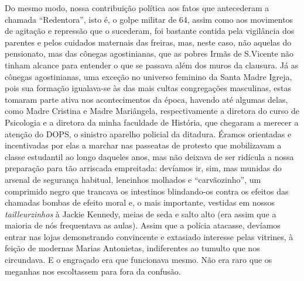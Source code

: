 Do mesmo modo, nossa contribuição política aos fatos que antecederam a chamada ``Redentora'', isto é, o golpe militar de 64, assim como aos movimentos de agitação e repressão que o sucederam, foi bastante contida pela vigilância dos parentes e pelos cuidados maternais das freiras, mas, neste caso, não aquelas do pensionato, mas das cônegas agostinianas, que as pobres Irmãs de S.Vicente não tinham alcance para entender o que se passava  além dos muros da clausura.
Já as cônegas agostinianas, uma exceção no universo feminino da Santa Madre Igreja, pois sua formação igualava-se às das mais cultas congregações masculinas, estas tomaram parte ativa nos acontecimentos da época, havendo até algumas delas, como Madre Cristina e Madre Mariângela, respectivamente a diretora do curso de Psicologia e a diretora da minha faculdade de História, que chegaram a merecer a atenção do DOPS, o sinistro aparelho policial da ditadura.
Éramos orientadas e incentivadas por elas a marchar nas passeatas de protesto que mobilizavam a classe estudantil ao longo daqueles anos, mas não deixava de ser ridícula a nossa preparação para tão arriscada empreitada: devíamos ir, sim, mas munidas do arsenal de segurança habitual, lencinhos molhados e ``carvãozinho'', um comprimido negro que trancava os intestinos blindando-os contra os efeitos das chamadas bombas de efeito moral e, o mais importante, vestidas em nossos \textit{tailleurzinhos} à Jackie Kennedy, meias de seda e salto alto (era assim que a maioria de nós frequentava as aulas).
Assim que a polícia atacasse, devíamos entrar nas lojas demonstrando convincente e extasiado interesse pelas vitrines, à feição de modernas Marias Antonietas, indiferentes ao tumulto que nos circundava.
E o engraçado era que funcionava mesmo.
Não era raro que os meganhas nos escoltassem para fora da confusão.

